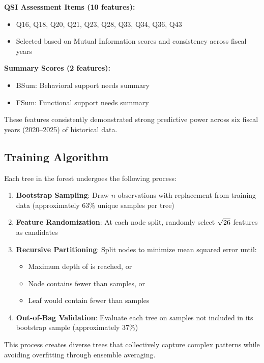 \textbf{QSI Assessment Items (10 features):}
\begin{itemize}
    \item Q16, Q18, Q20, Q21, Q23, Q28, Q33, Q34, Q36, Q43
    \item Selected based on Mutual Information scores and consistency across fiscal years
\end{itemize}

\textbf{Summary Scores (2 features):}
\begin{itemize}
    \item BSum: Behavioral support needs summary
    \item FSum: Functional support needs summary
\end{itemize}

These features consistently demonstrated strong predictive power across six fiscal years (2020--2025) of historical data.

\subsection{Training Algorithm}

Each tree in the forest undergoes the following process:

\begin{enumerate}
    \item \textbf{Bootstrap Sampling}: Draw $n$ observations with replacement from training data (approximately 63\% unique samples per tree)
    \item \textbf{Feature Randomization}: At each node split, randomly select $\sqrt{26{}}$ features as candidates
    \item \textbf{Recursive Partitioning}: Split nodes to minimize mean squared error until:
    \begin{itemize}
        \item Maximum depth of \ModelNineMaxDepth{} is reached, or
        \item Node contains fewer than \ModelNineMinSamplesSplit{} samples, or
        \item Leaf would contain fewer than \ModelNineMinSamplesLeaf{} samples
    \end{itemize}
    \item \textbf{Out-of-Bag Validation}: Evaluate each tree on samples not included in its bootstrap sample (approximately 37\%)
\end{enumerate}

This process creates diverse trees that collectively capture complex patterns while avoiding overfitting through ensemble averaging.

